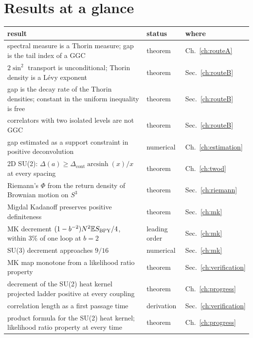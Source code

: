\section{Results at a glance}

\begin{center}
\scriptsize
\begin{tabular}{p{2.55in}p{0.85in}p{0.6in}}
\toprule
result & status & where \\ \midrule
spectral measure is a Thorin measure\index{Thorin measure}; gap is the tail index of a GGC~\cite{Th77} & theorem & Ch.~\ref{ch:routeA} \\
$2\sin^2$ transport is unconditional; Thorin density\index{Thorin density} is a L\'evy exponent\index{Levy exponent@L\'evy exponent} & theorem & Sec.~\ref{ch:routeB} \\
gap is the decay rate of the Thorin densities; constant in the uniform inequality is free & theorem & Sec.~\ref{ch:routeB} \\
correlators with two isolated levels are not GGC & theorem & Sec.~\ref{ch:routeB} \\
gap estimated as a support constraint in positive deconvolution\index{positive deconvolution} & numerical & Ch.~\ref{ch:estimation} \\
2D SU(2): $\Delta(a)\ge\Delta_{\mathrm{cont}}\operatorname{arcsinh}(x)/x$ at every spacing & theorem & Ch.~\ref{ch:twod} \\
Riemann's $\Phi$ from the return density of Brownian motion\index{Brownian motion on SU(2)} on $S^3$ & theorem & Sec.~\ref{ch:riemann} \\
Migdal Kadanoff preserves positive definiteness & theorem & Sec.~\ref{ch:mk} \\
MK decrement $(1-b^{-2})N^2\mathbb{E} S_{\mathrm{BPY}}/4$, within $3\%$ of one loop at $b=2$ & leading order & Sec.~\ref{ch:mk} \\
SU(3) decrement approaches $9/16$ & numerical & Sec.~\ref{ch:mk} \\
MK map monotone from a likelihood ratio\index{likelihood ratio order} property & theorem & Sec.~\ref{ch:verification} \\
decrement of the SU(2) heat kernel projected ladder positive at every coupling & theorem & Ch.~\ref{ch:progress} \\
correlation length as a first passage time\index{first passage time} & derivation & Sec.~\ref{ch:verification} \\
product formula for the SU(2) heat kernel; likelihood ratio property at every time & theorem & Ch.~\ref{ch:progress} \\

\end{tabular}
\end{center}
